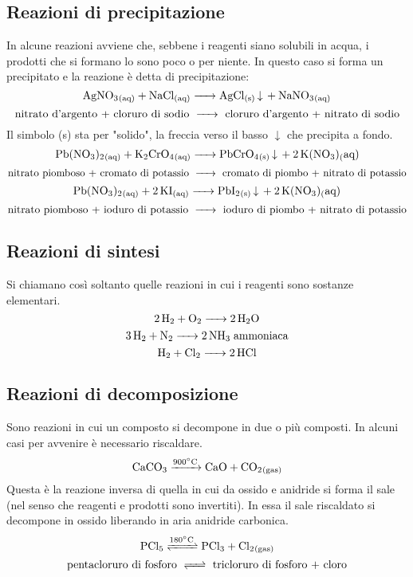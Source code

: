 \subsection{Reazioni di precipitazione}
In alcune reazioni avviene che, sebbene i reagenti siano solubili in acqua, i prodotti che si formano lo sono poco o per niente. In questo caso si forma un precipitato e la reazione è detta di precipitazione:
$$\ce{ AgNO_3_{(aq)} + NaCl_{(aq)} -> AgCl_{(s)} v  + NaNO_3_{(aq)} }$$
$$\text{nitrato d'argento + cloruro di sodio \ce{->} cloruro d'argento + nitrato di sodio}$$
Il simbolo (s) sta per "solido", la freccia verso il basso $\downarrow$ che precipita a fondo.
$$\ce{Pb(NO_3)_2_{(aq)} + K_2CrO_4_{(aq)} ->  PbCrO_4_{(s)} v + 2 K(NO_3){_(aq)}}$$
$$\text{nitrato piomboso + cromato di potassio \ce{->} cromato di piombo + nitrato di potassio}$$
$$\ce{Pb(NO_3)_2_{(aq)} + 2 KI_{(aq)} ->  PbI_2_{(s)} v + 2 K(NO_3){_(aq)}}$$
$$\text{nitrato piomboso + ioduro di potassio \ce{->} ioduro di piombo + nitrato di potassio}$$
\subsection{Reazioni di sintesi}
Si chiamano così soltanto quelle reazioni in cui i reagenti sono sostanze elementari.
$$\ce{2 H_2 + O_2 -> 2 H_2O}$$
$$\ce{3 H_2 + N_2 -> 2 NH_3} \; \text{ammoniaca}$$
$$\ce{H_2 + Cl_2 -> 2 HCl}$$
\subsection{Reazioni di decomposizione}
Sono reazioni in cui un composto si decompone in due o più composti. In alcuni casi per avvenire è necessario riscaldare.
$$\ce{CaCO_3 ->[{900^{\circ}C}] CaO + CO_2_{(gas)} }$$
Questa è la reazione inversa di quella in cui da ossido e anidride si forma il sale (nel senso che reagenti e prodotti sono invertiti). In essa il sale riscaldato si decompone in ossido liberando in aria anidride carbonica.
$$\ce{PCl_5 <=>[{180^{\circ}C}] PCl_3 + Cl_2_{(gas)}}$$
$$\text{pentacloruro di fosforo \ce{<=>} tricloruro di fosforo + cloro}$$